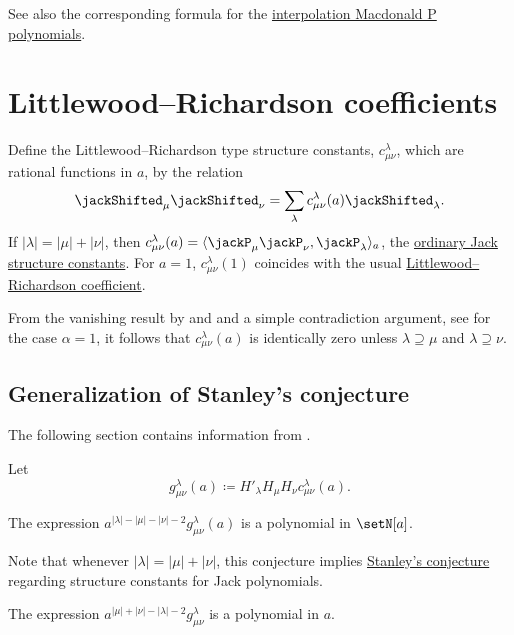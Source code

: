 See also the corresponding formula for 
the \hyperref[macdonaldPiRSSYTFormula]{interpolation Macdonald P polynomials}.


\section[jackShiftedLittlewoodRichardson]{Littlewood--Richardson coefficients}

Define the Littlewood--Richardson type structure constants, $c^{\lambda}_{\mu\nu}$,
which are rational functions in $a$, by the relation
\[
\jackShifted_\mu \jackShifted_\nu = \sum_\lambda c^{\lambda}_{\mu\nu}(a) \jackShifted_\lambda.
\]
If $|\lambda|=|\mu|+|\nu|$, then
$c^{\lambda}_{\mu\nu}(a) =
\langle \jackP_\mu \jackP_\nu, \jackP_\lambda \rangle_a$,
the \hyperref[jackLittlewoodRichardsonConjecture]{ordinary Jack structure constants}.
For $a = 1$, $c^{\lambda}_{\mu\nu}(1)$ coincides with the usual
\hyperref[littlewoodRichardsonCoefficient]{Littlewood--Richardson coefficient}.

From the vanishing result by  and 
\cite{KnopSahi1996} and a simple contradiction argument, see
\cite[p.~4434]{MolevSagan1999} for the case $\alpha=1$, it follows that
$c^{\lambda}_{\mu\nu}(a)$ is identically zero unless
$\lambda \supseteq \mu$ and $\lambda \supseteq \nu$.



\subsection[jackShiftedLittlewoodRichardsonConjecture]{Generalization of Stanley's conjecture}

The following section contains information from \cite{AlexanderssonFeray2019}.

Let
\[
g^{\lambda}_{\mu \nu}(a)
\coloneqq H'_\lambda H_\mu H_\nu c^{\lambda}_{\mu\nu}(a).
\]

\begin{conjecture}
The expression $a^{|\lambda|-|\mu|-|\nu|-2} g^{\lambda}_{\mu\nu}(a)$ is a polynomial in $\setN[a]$.
\end{conjecture}
Note that whenever $|\lambda|=|\mu|+|\nu|$, this conjecture
implies \hyperref[jackLittlewoodRichardsonConjecture]{Stanley's conjecture}
\cite{Stanley1989} regarding structure constants for Jack polynomials.


\begin{proposition}
The expression $a^{|\mu|+|\nu|-|\lambda|-2} g^{\lambda}_{\mu\nu}$ is a polynomial in $a$.
\end{proposition}

